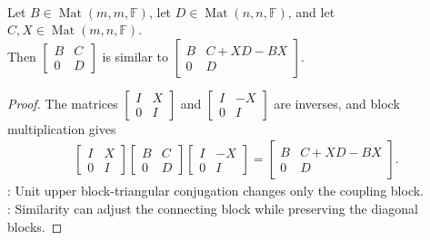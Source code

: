 \begin{proposition} \label{prop:upper-block-triangular-similarity-shift} \\
Let $B\in\operatorname{Mat}(m,m,\mathbb{F})$, let $D\in\operatorname{Mat}(n,n,\mathbb{F})$, and let $C,X\in\operatorname{Mat}(m,n,\mathbb{F})$.\\
Then $\begin{bmatrix}
B & C\\
0 & D
\end{bmatrix}
$ is similar to $\begin{bmatrix}
B & C+XD-BX\\
0 & D
\end{bmatrix}$.
\begin{proof}
The matrices $\begin{bmatrix} I & X\\ 0 & I \end{bmatrix}$ and $\begin{bmatrix} I & -X\\ 0 & I \end{bmatrix}$ are inverses, and block multiplication gives
\begin{align}
\begin{bmatrix}
I & X\\
0 & I
\end{bmatrix}
\begin{bmatrix}
B & C\\
0 & D
\end{bmatrix}
\begin{bmatrix}
I & -X\\
0 & I
\end{bmatrix}
=
\begin{bmatrix}
B & C+XD-BX\\
0 & D
\end{bmatrix}.
\nonumber
\end{align}
: Unit upper block-triangular conjugation changes only the coupling block.\\
: Similarity can adjust the connecting block while preserving the diagonal blocks.
\end{proof}
\end{proposition}
